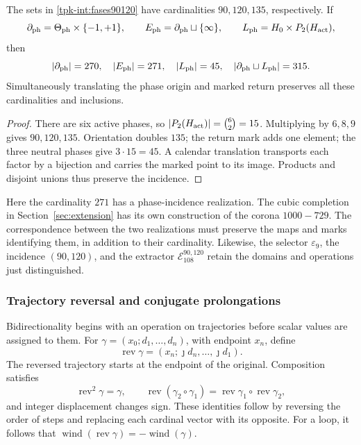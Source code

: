 \begin{proposition}
\label{tpk-int:cardinales}
The sets in \eqref{tpk-int:fases90120} have cardinalities
\(90,120,135\), respectively. If
\[
 \partial_{\rm ph}=\Theta_{\rm ph}\times\{-1,+1\},\qquad
 E_{\rm ph}=\partial_{\rm ph}\sqcup\{\infty\},\qquad
 L_{\rm ph}=H_0\times P_2(H_{\rm act}),
\]
then
\[
 |\partial_{\rm ph}|=270,\quad |E_{\rm ph}|=271,\quad
 |L_{\rm ph}|=45,\quad
 |\partial_{\rm ph}\sqcup L_{\rm ph}|=315.
\]
Simultaneously translating the phase origin and marked return preserves
all these cardinalities and inclusions.
\end{proposition}
\begin{proof}
There are six active phases, so
\(|P_2(H_{\rm act})|=\binom62=15\). Multiplying by
\(6,8,9\) gives \(90,120,135\). Orientation doubles \(135\);
the return mark adds one element; the three neutral phases give
\(3\cdot15=45\). A calendar translation transports each factor
by a bijection and carries the marked point to its image. Products
and disjoint unions thus preserve the incidence.
\end{proof}

Here the cardinality \(271\) has a phase-incidence realization.
The cubic completion in Section~\ref{sec:extension} has its own
construction of the corona \(1000-729\). The correspondence
between the two realizations must preserve the maps and marks
identifying them, in addition to their cardinality. Likewise,
the selector \(\varepsilon_9\), the incidence \((90,120)\),
and the extractor \(\mathcal E_{108}^{90,120}\) retain the
domains and operations just distinguished.

\subsubsection{Trajectory reversal and conjugate prolongations}
\label{tpk-int:bidireccionalidad}

Bidirectionality begins with an operation on trajectories before scalar
values are assigned to them. For
\(\gamma=(x_0;d_1,\ldots,d_n)\), with endpoint \(x_n\), define
\[
 \operatorname{rev}\gamma
   =(x_n;\jmath d_n,\ldots,\jmath d_1).
\]
The reversed trajectory starts at the endpoint of the original.
Composition satisfies
\[
 \operatorname{rev}^2\gamma=\gamma,\qquad
 \operatorname{rev}(\gamma_2\circ\gamma_1)
   =\operatorname{rev}\gamma_1\circ\operatorname{rev}\gamma_2,
\]
and integer displacement changes sign. These identities follow by
reversing the order of steps and replacing each cardinal vector
with its opposite. For a loop, it follows that
\(\operatorname{wind}(\operatorname{rev}\gamma)
=-\operatorname{wind}(\gamma)\).

